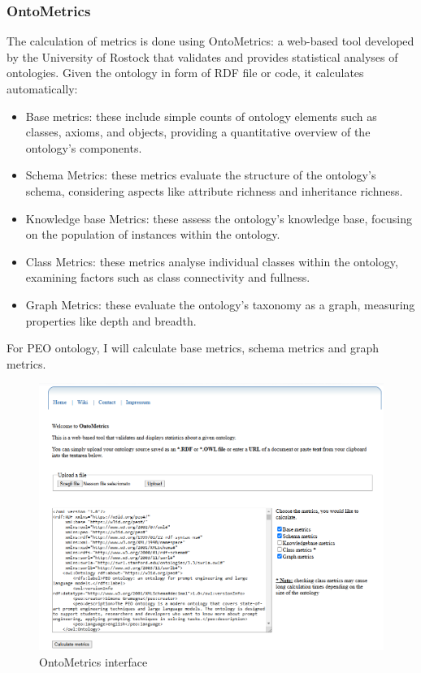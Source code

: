 \subsubsection{OntoMetrics}
The calculation of metrics is done using OntoMetrics: a web-based tool developed by the University of Rostock that validates and provides statistical analyses of ontologies.\cite{lantow2016ontometrics}
Given the ontology in form of RDF file or code, it calculates automatically:
\begin{itemize}
    \item Base metrics: these include simple counts of ontology elements such as classes, axioms, and objects, providing a quantitative overview of the ontology's components.

    \item Schema Metrics: these metrics evaluate the structure of the ontology's schema, considering aspects like attribute richness and inheritance richness.

    \item Knowledge base Metrics: these assess the ontology's knowledge base, focusing on the population of instances within the ontology.

    \item Class Metrics: these metrics analyse individual classes within the ontology, examining factors such as class connectivity and fullness.

    \item Graph Metrics: these evaluate the ontology's taxonomy as a graph, measuring properties like depth and breadth.
\end{itemize}
For PEO ontology, I will calculate base metrics, schema metrics and graph metrics.
\begin{figure}[H]
    \centering
    \includegraphics[width=0.9\linewidth]{Figures/fig_41.png}
    \caption{OntoMetrics interface}
    \label{fig:enter-label}
\end{figure}

